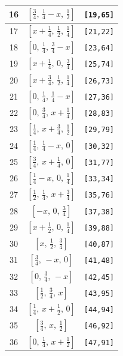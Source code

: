 \documentclass[fleqn,8pt]{jsarticle}
\begin{document}
\begin{longtable}{ccc}
16 & $\left[ \frac{3}{4},\, \frac{1}{4} - x,\, \frac{1}{2} \right]$ & {\tt [19,65]} \\ \hline
17 & $\left[ x + \frac{1}{4},\, \frac{1}{2},\, \frac{1}{4} \right]$ & {\tt [21,22]} \\ \hline
18 & $\left[ 0,\, \frac{1}{4},\, \frac{3}{4} - x \right]$ & {\tt [23,64]} \\ \hline
19 & $\left[ x + \frac{1}{4},\, 0,\, \frac{3}{4} \right]$ & {\tt [25,74]} \\ \hline
20 & $\left[ x + \frac{3}{4},\, \frac{1}{2},\, \frac{1}{4} \right]$ & {\tt [26,73]} \\ \hline
21 & $\left[ 0,\, \frac{1}{4},\, \frac{1}{4} - x \right]$ & {\tt [27,36]} \\ \hline
22 & $\left[ 0,\, \frac{3}{4},\, x + \frac{1}{4} \right]$ & {\tt [28,83]} \\ \hline
23 & $\left[ \frac{1}{4},\, x + \frac{3}{4},\, \frac{1}{2} \right]$ & {\tt [29,79]} \\ \hline
24 & $\left[ \frac{1}{4},\, \frac{1}{4} - x,\, 0 \right]$ & {\tt [30,32]} \\ \hline
25 & $\left[ \frac{3}{4},\, x + \frac{1}{4},\, 0 \right]$ & {\tt [31,77]} \\ \hline
26 & $\left[ \frac{1}{4} - x,\, 0,\, \frac{1}{4} \right]$ & {\tt [33,34]} \\ \hline
27 & $\left[ \frac{1}{2},\, \frac{1}{4},\, x + \frac{3}{4} \right]$ & {\tt [35,76]} \\ \hline
28 & $\left[ - x,\, 0,\, \frac{3}{4} \right]$ & {\tt [37,38]} \\ \hline
29 & $\left[ x + \frac{1}{2},\, 0,\, \frac{1}{4} \right]$ & {\tt [39,88]} \\ \hline
30 & $\left[ x,\, \frac{1}{2},\, \frac{3}{4} \right]$ & {\tt [40,87]} \\ \hline
31 & $\left[ \frac{3}{4},\, - x,\, 0 \right]$ & {\tt [41,48]} \\ \hline
32 & $\left[ 0,\, \frac{3}{4},\, - x \right]$ & {\tt [42,45]} \\ \hline
33 & $\left[ \frac{1}{2},\, \frac{3}{4},\, x \right]$ & {\tt [43,95]} \\ \hline
34 & $\left[ \frac{1}{4},\, x + \frac{1}{2},\, 0 \right]$ & {\tt [44,94]} \\ \hline
35 & $\left[ \frac{3}{4},\, x,\, \frac{1}{2} \right]$ & {\tt [46,92]} \\ \hline
36 & $\left[ 0,\, \frac{1}{4},\, x + \frac{1}{2} \right]$ & {\tt [47,91]} \\ \hline

\end{longtable}
\end{document}
